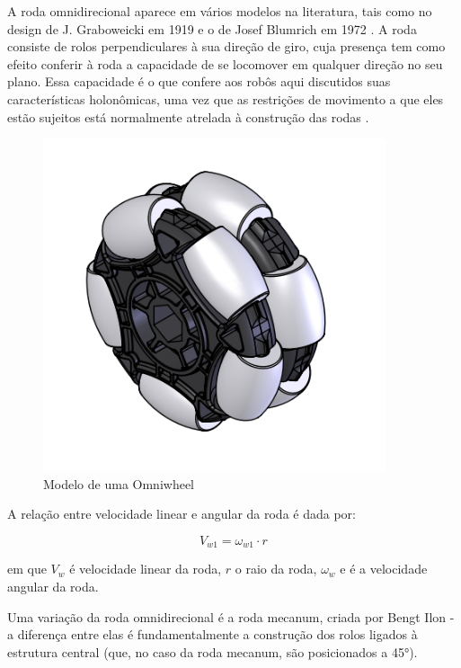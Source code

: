 A roda omnidirecional aparece em vários modelos na literatura, tais como no design de J. Graboweicki em 1919 \cite{patent_US1305535A} e o de Josef Blumrich em 1972 \cite{patent_US3789947A}. A roda consiste de rolos perpendiculares à  sua direção de giro, cuja presença tem como efeito conferir à roda a capacidade de se locomover em qualquer direção no seu plano. Essa capacidade é o que confere aos robôs aqui discutidos suas características holonômicas, uma vez que as restrições de movimento a que eles estão sujeitos está normalmente atrelada à construção das rodas \cite{TAKAHASHI}.

\begin{figure}[h]
	\centering
	\includegraphics{figures/omniwheel}
	\caption{Modelo de uma Omniwheel \cite{draw_omniwheel}}
\end{figure}

A relação entre velocidade linear e angular da roda é dada por:

\[V_{w1} = \omega_{w1}\cdot r \] 

em que $V_{w}$ é velocidade linear da roda, $r$ o raio da roda, $\omega_{w} $ e é a velocidade angular da roda.

Uma variação da roda omnidirecional é a roda mecanum, criada por Bengt Ilon \cite{patent_US3876255A} - a diferença entre elas é fundamentalmente a construção dos rolos ligados à estrutura central (que, no caso da roda mecanum, são posicionados a 45°).

